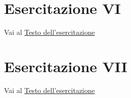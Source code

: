 	\section{Esercitazione VI}
Vai al \href{http://www.mc3.disco.unimib.it/lif/Dep/eslab6.pdf}{Testo dell'esercitazione}
		
		
		

	\section{Esercitazione VII}
Vai al \href{http://www.mc3.disco.unimib.it/lif/Dep/eslab7.pdf}{Testo dell'esercitazione}	
		